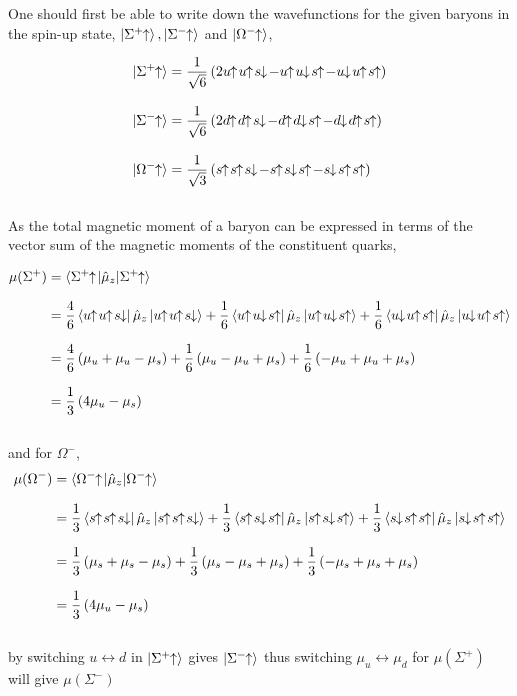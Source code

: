 \begin{solution}
One should first be able to write down the wavefunctions for the given baryons in the spin-up state, $\ket{\Sigma^+ \!\!\uparrow\!\,},\ket{\Sigma^-\!\!\uparrow\!\,}$ and $\ket{\Omega^-\!\!\uparrow\!\,}$,

\begin{align*}
    \ket{\Sigma^+ \spinup\,} &= \frac{1}{\sqrt{6}}\left( 2u\spinup u\spinup s\spindown - u\spinup u\spindown s\spinup -u\spindown u\spinup s\spinup \, \right) \\[0.12in]
    \ket{\Sigma^- \spinup\,} &= \frac{1}{\sqrt{6}}\left( 2d\spinup d\spinup s\spindown - d\spinup d\spindown s\spinup -d\spindown d\spinup s\spinup \, \right) \\[0.12in]
    \ket{\Omega^- \spinup\,} &= \frac{1}{\sqrt{3}}\left( s\spinup s\spinup s\spindown - s\spinup s\spindown s\spinup -s\spindown s\spinup s\spinup \, \right)
\end{align*}\\
As the total magnetic moment of a baryon can be expressed in terms of the vector sum of the magnetic moments of the constituent quarks,

\begin{align*}
    \mu(\Sigma^+) &= \braket{\Sigma^+ \spinup |\hat{\mu}_z |\Sigma^+ \spinup \,} \\[0.1in]
                  &= \frac{4}{6}\bra{u\spinup u\spinup s\spindown \,} \hat{\mu}_z \ket{u\spinup u\spinup s\spindown \,} + \frac{1}{6}\bra{u\spinup u\spindown s\spinup \,} \hat{\mu}_z \ket{u\spinup u\spindown s\spinup \,} + \frac{1}{6}\bra{u\spindown u\spinup s\spinup \,} \hat{\mu}_z \ket{u\spindown u\spinup s\spinup \,} \\[0.1in]
                  &= \frac{4}{6} \left( \mu_u + \mu_u - \mu_s \right) + \frac{1}{6} \left( \mu_u - \mu_u + \mu_s \right) + \frac{1}{6} \left( - \mu_u + \mu_u + \mu_s \right) \\[0.1in]
                  &=  \frac{1}{3} \left( 4\mu_u - \mu_s \right)
\end{align*}\\
and for $\Omega^-$,
\begin{align*}
    \mu(\Omega^-) &= \braket{\Omega^- \spinup |\hat{\mu}_z |\Omega^- \spinup \,} \\[0.1in]
                  &= \frac{1}{3}\bra{s\spinup s\spinup s\spindown \,} \hat{\mu}_z \ket{s\spinup s\spinup s\spindown \,} + \frac{1}{3}\bra{s\spinup s\spindown s\spinup \,} \hat{\mu}_z \ket{s\spinup s\spindown s\spinup \,} + \frac{1}{3}\bra{s\spindown s\spinup s\spinup \,} \hat{\mu}_z \ket{s\spindown s\spinup s\spinup \,} \\[0.1in]
                  &= \frac{1}{3} \left( \mu_s + \mu_s - \mu_s \right) + \frac{1}{3} \left( \mu_s - \mu_s + \mu_s \right) + \frac{1}{3} \left( - \mu_s + \mu_s + \mu_s \right) \\[0.1in]
                  &=  \frac{1}{3} \left( 4\mu_u - \mu_s \right) 
\end{align*}\\
by switching $u\leftrightarrow d$ in $\ket{\Sigma^+ \!\!\uparrow\!\,}$ gives $\ket{\Sigma^- \!\!\uparrow\!\,} $ thus switching $\mu_u \leftrightarrow \mu_d$ for $\mu(\Sigma^+)$ will give $\mu(\Sigma^-)$
\end{solution}


